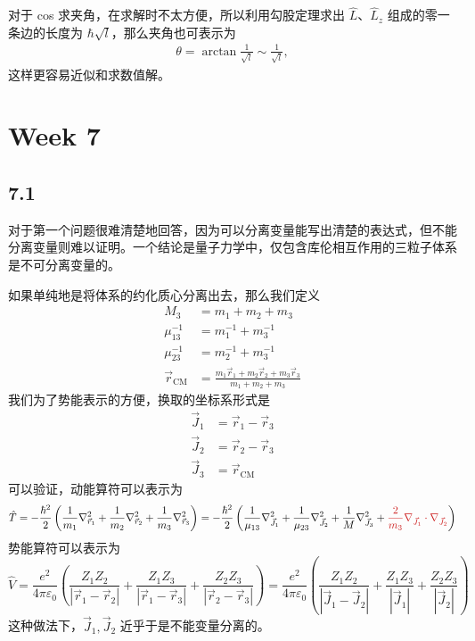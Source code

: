 对于 cos 求夹角，在求解时不太方便，所以利用勾股定理求出 $\hat L$、$\hat L_z$ 组成的零一条边的长度为 $\hbar \sqrt{l}$，那么夹角也可表示为
\begin{align}
    \theta = \arctan \frac1{\sqrt{l}} \sim \frac1{\sqrt l}, 
\end{align}
这样更容易近似和求数值解。

\section{Week 7}
\subsection{7.1}
对于第一个问题很难清楚地回答，因为可以分离变量能写出清楚的表达式，但不能分离变量则难以证明。一个结论是量子力学中，仅包含\textsf{库伦相互作用}的三粒子体系是不可分离变量的。

如果单纯地是将体系的约化质心分离出去，那么我们定义
\begin{align*}
M_3 &= m_1 + m_2 + m_3 \\
\mu_{13}^{-1} &= m_1^{-1} + m_3^{-1} \\
\mu_{23}^{-1} &= m_2^{-1} + m_3^{-1} \\
\vec{r}_\mathrm{CM} &= \frac{m_1 \vec{r}_1 + m_2 \vec{r}_2 + m_3 \vec{r}_3}{m_1 + m_2 + m_3}
\end{align*}
我们为了势能表示的方便，换取的坐标系形式是
\begin{align*}
\vec{J}_1 &= \vec{r}_1 - \vec{r}_3 \\
\vec{J}_2 &= \vec{r}_2 - \vec{r}_3 \\
\vec{J}_3 &= \vec{r}_\mathrm{CM}
\end{align*}
可以验证，动能算符可以表示为
\begin{equation*}
\hat T
= - \frac{\hbar^2}{2} \left( \frac{1}{m_1} \nabla_{\vec{r}_1}^2 + \frac{1}{m_2} \nabla_{\vec{r}_2}^2 + \frac{1}{m_3} \nabla_{\vec{r}_3}^2 \right)
= - \frac{\hbar^2}{2} \left( \frac{1}{\mu_{13}} \nabla_{\vec{J}_1}^2 + \frac{1}{\mu_{23}} \nabla_{\vec{J}_2}^2 + \frac{1}{M} \nabla_{\vec{J}_3}^2 + {\color{fudanRed} \frac{2}{m_3} \nabla_{\vec{J}_1} \cdot \nabla_{\vec{J}_2}} \right)
\end{equation*}
势能算符可以表示为
\begin{equation*}
\hat V
= \frac{e^2}{4 \pi \varepsilon_0} \left( \frac{Z_1 Z_2}{|\vec{r}_1 - \vec{r}_2|} + \frac{Z_1 Z_3}{|\vec{r}_1 - \vec{r}_3|} + \frac{Z_2 Z_3}{|\vec{r}_2 - \vec{r}_3|} \right)
= \frac{e^2}{4 \pi \varepsilon_0} \left( \frac{Z_1 Z_2}{|\vec{J}_1 - \vec{J}_2|} + \frac{Z_1 Z_3}{|\vec{J}_1|} + \frac{Z_2 Z_3}{|\vec{J}_2|} \right)
\end{equation*}
这种做法下，$\vec{J}_1, \vec{J}_2$ 近乎于是不能变量分离的。

